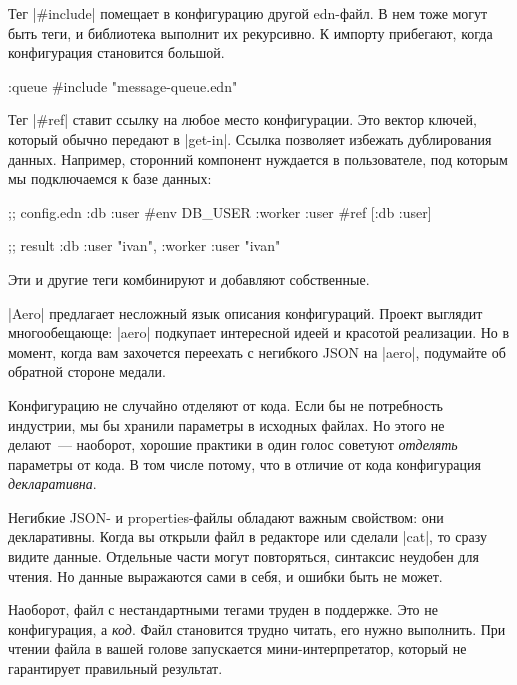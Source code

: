 Тег \spverb|#include| помещает в конфигурацию другой edn-файл. В нем тоже могут
быть теги, и библиотека выполнит их рекурсивно. К импорту прибегают, когда
конфигурация становится большой.

\begin{english}
  \begin{clojure}
{:queue #include "message-queue.edn"}
  \end{clojure}
\end{english}

Тег \spverb|#ref| ставит ссылку на любое место конфигурации. Это вектор ключей,
который обычно передают в \spverb|get-in|. Ссылка позволяет избежать
дублирования данных. Например, сторонний компонент нуждается в пользователе, под
которым мы подключаемся к базе данных:

\begin{english}
  \begin{clojure}
;; config.edn
{:db {:user #env DB_USER}
 :worker {:user #ref [:db :user]}}

;; result
{:db {:user "ivan"}, :worker {:user "ivan"}}
  \end{clojure}
\end{english}

Эти и другие теги комбинируют и добавляют собственные.

\spverb|Aero| предлагает несложный язык описания конфигураций. Проект выглядит
многообещающе: \spverb|aero| подкупает интересной идеей и красотой
реализации. Но в момент, когда вам захочется переехать с негибкого JSON на
\spverb|aero|, подумайте об обратной стороне медали.

Конфигурацию не случайно отделяют от кода. Если бы не потребность индустрии, мы
бы хранили параметры в исходных файлах. Но этого не делают~--- наоборот, хорошие
практики в один голос советуют \emph{отделять} параметры от кода. В том числе
потому, что в отличие от кода конфигурация \emph{декларативна}.

Негибкие JSON- и properties-файлы обладают важным свойством: они
декларативны. Когда вы открыли файл в редакторе или сделали \spverb|cat|, то
сразу видите данные. Отдельные части могут повторяться, синтаксис неудобен для
чтения. Но данные выражаются сами в себя, и ошибки быть не может.

Наоборот, файл с нестандартными тегами труден в поддержке. Это не конфигурация,
а \emph{код}. Файл становится трудно читать, его нужно выполнить. При чтении
файла в вашей голове запускается мини-интерпретатор, который не гарантирует
правильный результат.


